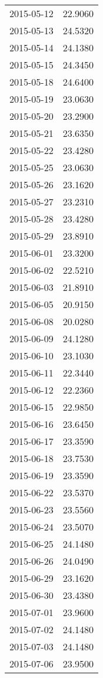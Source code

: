 \begin{tabular}{lr}
2015-05-12 &     22.9060 \\
2015-05-13 &     24.5320 \\
2015-05-14 &     24.1380 \\
2015-05-15 &     24.3450 \\
2015-05-18 &     24.6400 \\
2015-05-19 &     23.0630 \\
2015-05-20 &     23.2900 \\
2015-05-21 &     23.6350 \\
2015-05-22 &     23.4280 \\
2015-05-25 &     23.0630 \\
2015-05-26 &     23.1620 \\
2015-05-27 &     23.2310 \\
2015-05-28 &     23.4280 \\
2015-05-29 &     23.8910 \\
2015-06-01 &     23.3200 \\
2015-06-02 &     22.5210 \\
2015-06-03 &     21.8910 \\
2015-06-05 &     20.9150 \\
2015-06-08 &     20.0280 \\
2015-06-09 &     24.1280 \\
2015-06-10 &     23.1030 \\
2015-06-11 &     22.3440 \\
2015-06-12 &     22.2360 \\
2015-06-15 &     22.9850 \\
2015-06-16 &     23.6450 \\
2015-06-17 &     23.3590 \\
2015-06-18 &     23.7530 \\
2015-06-19 &     23.3590 \\
2015-06-22 &     23.5370 \\
2015-06-23 &     23.5560 \\
2015-06-24 &     23.5070 \\
2015-06-25 &     24.1480 \\
2015-06-26 &     24.0490 \\
2015-06-29 &     23.1620 \\
2015-06-30 &     23.4380 \\
2015-07-01 &     23.9600 \\
2015-07-02 &     24.1480 \\
2015-07-03 &     24.1480 \\
2015-07-06 &     23.9500 \\

\end{tabular}
